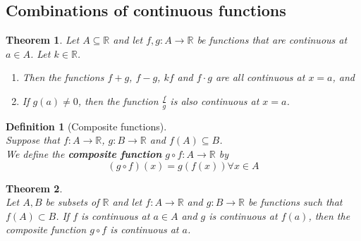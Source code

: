 \documentclass[8pt]{article}
\newtheorem{definition}{Definition}[section]
\newtheorem{theorem}{Theorem}[section]
\theoremstyle{definition}
\begin{document}
\subsection{Combinations of continuous functions}
\begin{theorem}\normalfont Let $A\subseteq \mathbb{R}$ and let $f,g:A\to \mathbb{R}$ be functions that are continuous at $a\in A$. Let $k\in\mathbb{R}$.
\begin{enumerate}
\item Then the functions $f+g$, $f-g$, $kf$ and $f\cdot g$ are all continuous at $x=a$, and
\item If $g(a)\neq 0$, then the function $\frac{f}{g}$ is also continuous at $x=a$.
\end{enumerate}
\end{theorem}
\begin{definition}[Composite functions]
\hfill\\\normalfont Suppose that $f:A\to\mathbb{R}$, $g: B\to\mathbb{R}$ and $f(A)\subseteq B$.\\
We define the \textbf{composite function} $g\circ f:A\to \mathbb{R}$ by
\[
(g\circ f)(x)=g(f(x))\forall x\in A
\]
\end{definition}
\begin{theorem}
\hfill\\\normalfont Let $A, B$ be subsets of $\mathbb{R}$ and let $f:A\to\mathbb{R}$ and $g:B\to\mathbb{R}$ be functions such that $f(A)\subset B$. If $f$ is continuous at $a\in A$ and $g$ is continuous at $f(a)$, then the composite function $g\circ f$ is continuous at $a$.
\end{theorem}
\end{document}
